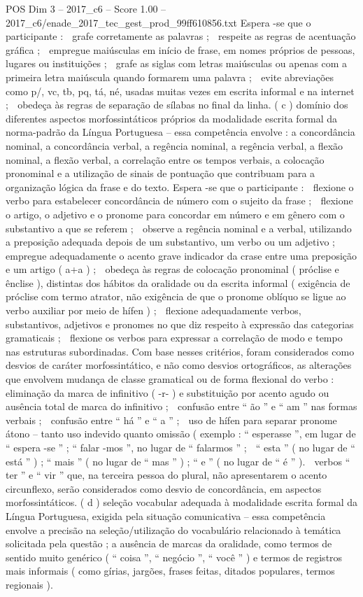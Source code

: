\begin{textsample}{POS Dim 3 – 2017\_c6 – Score 1.00 – 2017\_c6/enade\_2017\_tec\_gest\_prod\_99ff610856.txt}
Espera -se que o participante :  grafe corretamente as palavras ;  respeite as regras de acentuação gráfica ;  empregue maiúsculas em início de frase, em nomes próprios de pessoas, lugares ou instituições ;  grafe as siglas com letras maiúsculas ou apenas com a primeira letra maiúscula quando formarem uma palavra ;  evite abreviações como p/, vc, tb, pq, tá, né, usadas muitas vezes em escrita informal e na internet ;  obedeça às regras de separação de sílabas no final da linha. ( c ) domínio dos diferentes aspectos morfossintáticos próprios da modalidade escrita formal da norma-padrão da Língua Portuguesa – essa competência envolve : a concordância nominal, a concordância verbal, a regência nominal, a regência verbal, a flexão nominal, a flexão verbal, a correlação entre os tempos verbais, a colocação pronominal e a utilização de sinais de pontuação que contribuam para a organização lógica da frase e do texto.
Espera -se que o participante :  flexione o verbo para estabelecer concordância de número com o sujeito da frase ;  flexione o artigo, o adjetivo e o pronome para concordar em número e em gênero com o substantivo a que se referem ;  observe a regência nominal e a verbal, utilizando a preposição adequada depois de um substantivo, um verbo ou um adjetivo ;  empregue adequadamente o acento grave indicador da crase entre uma preposição e um artigo ( a+a ) ;  obedeça às regras de colocação pronominal ( próclise e ênclise ), distintas dos hábitos da oralidade ou da escrita informal ( exigência de próclise com termo atrator, não exigência de que o pronome oblíquo se ligue ao verbo auxiliar por meio de hífen ) ;  flexione adequadamente verbos, substantivos, adjetivos e pronomes no que diz respeito à expressão das categorias gramaticais ;  flexione os verbos para expressar a correlação de modo e tempo nas estruturas subordinadas.
Com base nesses critérios, foram considerados como desvios de caráter morfossintático, e não como desvios ortográficos, as alterações que envolvem mudança de classe gramatical ou de forma flexional do verbo :  eliminação da marca de infinitivo ( -r- ) e substituição por acento agudo ou ausência total de marca do infinitivo ;  confusão entre “ ão ” e “ am ” nas formas verbais ;  confusão entre “ há ” e “ a ” ;  uso de hífen para separar pronome átono – tanto uso indevido quanto omissão ( exemplo : “ esperasse ”, em lugar de “ espera -se ” ; “ falar -mos ”, no lugar de “ falarmos ” ;  “ esta ” ( no lugar de “ está ” ) ; “ mais ” ( no lugar de “ mas ” ) ; “ e ” ( no lugar de “ é ” ).  verbos “ ter ” e “ vir ” que, na terceira pessoa do plural, não apresentarem o acento circunflexo, serão considerados como desvio de concordância, em aspectos morfossintáticos. ( d ) seleção vocabular adequada à modalidade escrita formal da Língua Portuguesa, exigida pela situação comunicativa – essa competência envolve a precisão na seleção/utilização do vocabulário relacionado à temática solicitada pela questão ; a ausência de marcas da oralidade, como termos de sentido muito genérico ( “ coisa ”, “ negócio ”, “ você ” ) e termos de registros mais informais ( como gírias, jargões, frases feitas, ditados populares, termos regionais ).

\end{textsample}
